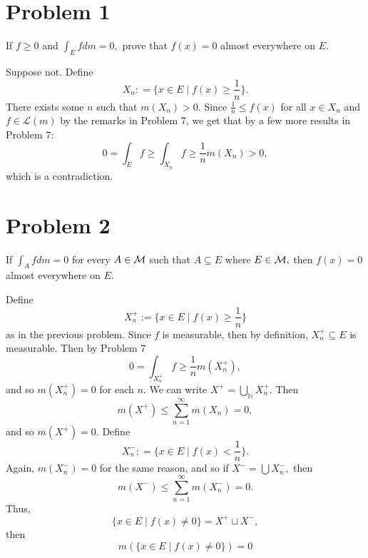 \documentclass[11pt]{article}
\newcommand{\bbN}{\mathbb{N}}
\begin{document}
	
	
	\psetheader

\section*{Problem 1}
\begin{problem}
    If $f\geq 0$ and $\int_E f dm = 0,$ prove that $f(x) = 0$ almost everywhere on $E.$
\end{problem}
\begin{solution}
Suppose not.  Define 
    \[X_n : = \{x \in E \mid f(x) \geq \frac{1}{n}\}.\] There exists some $n$ such that $m(X_n) >0.$  Since $\frac{1}{n} \leq f(x)$ for all $x \in X_n$ and $f \in \mathcal{L}(m)$ by the remarks in Problem 7, we get that by a few more results in Problem 7:
\[ 0 = \int_E f \geq \int_{X_n}f \geq \frac{1}{n}m(X_n) >0,\] which is a contradiction.
\end{solution}

\newpage
\section*{Problem 2}
\begin{problem}
If $\int_A f dm  = 0$ for every $A \in \cal M$ such that $A \subseteq E$ where $E\in \cal M,$ then $f(x) = 0$ almost everywhere on $E.$    
\end{problem}
\begin{solution}
Define \[X_n^+:= \{x \in E \mid f(x) \geq \frac{1}{n}\}\] as in the previous problem. Since $f$ is measurable, then by definition, $X_n^+\subseteq E$ is measurable. Then by Problem 7
\[0 = \int_{X_n^+} f \geq \frac{1}{n}m(X_n^+),\] and so $m(X_n^+) = 0$ for each $n.$ 
We can write $X^+ = \displaystyle\bigcup_\bbN X_n^+.$ Then 
\[m(X^+) \leq \sum_{n=1}^\infty m(X_n) = 0,\] and so $m(X^+) = 0.$ Define
\[X_n^- ;= \{x \in E \mid f(x) < \frac{1}{n}\}.\] Again, $m(X_n^-) = 0$ for the same reason, and so if $X^- = \bigcup X_n^-,$ then
\[m(X^-) \leq \sum_{n=1}^\infty m(X_n^-) = 0.\] Thus, 
\[\{x \in E \mid f(x) \neq 0\} = X^+ \sqcup X^-,\] then 
\[m(\{x \in E \mid f(x) \neq 0\}) = 0\]
\end{solution}

\newpage
\end{document}
